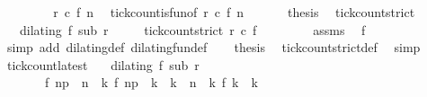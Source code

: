 \begin{isabellebody}
\isanewline
\ \ \isamarkupfalse%
\ \isamarkupfalse%
\ {\isacartoucheopen}{\isachardot}{\isachardot}{\isachardot}\ {\isacharequal}\ {\isacharhash}\isactrlsub {\isasymle}\ r\ c\ {\isacharparenleft}f\ n{\isacharparenright}{\isacartoucheclose}\ \isamarkupfalse%
\ tick{\isacharunderscore}count{\isacharunderscore}is{\isacharunderscore}fun{\isacharbrackleft}of\ r\ c\ {\isacartoucheopen}f\ n{\isacartoucheclose}{\isacharbrackright}\ \isacommand{{\isachardot}}\isamarkupfalse%
\isanewline
\ \ \isamarkupfalse%
\ \isamarkupfalse%
\ {\isacharquery}thesis\ \isacommand{{\isachardot}}\isamarkupfalse%
\isanewline
{}\isamarkupfalse%
%
\endisatagproof
{\isafoldproof}%
%
\isadelimproof
\isanewline
%
\endisadelimproof
\isanewline
{}\isamarkupfalse%
\ tick{\isacharunderscore}count{\isacharunderscore}strict{\isacharunderscore}{}{\isacharcolon}\isanewline
\ \ \ {\isacartoucheopen}dilating\ f\ sub\ r{\isacartoucheclose}\isanewline
\ \ \ \ \ {\isacartoucheopen}tick{\isacharunderscore}count{\isacharunderscore}strict\ r\ c\ {\isacharparenleft}f\ {}{\isacharparenright}\ {\isacharequal}\ {}{\isacartoucheclose}\isanewline
%
\isadelimproof
%
\endisadelimproof
%
\isatagproof
{}\isamarkupfalse%
\ {\isacharminus}\isanewline
\ \ \isamarkupfalse%
\ assms\ \isamarkupfalse%
\ {\isacartoucheopen}f\ {}\ {\isacharequal}\ {}{\isacartoucheclose}\ \isamarkupfalse%
\ {\isacharparenleft}simp\ add{\isacharcolon}\ dilating{\isacharunderscore}def\ dilating{\isacharunderscore}fun{\isacharunderscore}def{\isacharparenright}\isanewline
\ \ \isamarkupfalse%
\ {\isacharquery}thesis\ \isamarkupfalse%
\ tick{\isacharunderscore}count{\isacharunderscore}strict{\isacharunderscore}def\ \isamarkupfalse%
\ simp\isanewline
{}\isamarkupfalse%
%
\endisatagproof
{\isafoldproof}%
%
\isadelimproof
\isanewline
%
\endisadelimproof
\isanewline
{}\isamarkupfalse%
\ tick{\isacharunderscore}count{\isacharunderscore}latest{\isacharcolon}\isanewline
\ \ \ {\isacartoucheopen}dilating\ f\ sub\ r{\isacartoucheclose}\isanewline
\ \ \ \ \ \ \ {\isacartoucheopen}f\ n\isactrlsub p\ {\isacharless}\ n\ {\isasymand}\ {\isacharparenleft}{\isasymforall}k{\isachardot}\ f\ n\isactrlsub p\ {\isacharless}\ k\ {\isasymand}\ k\ {\isasymle}\ n\ {\isasymlongrightarrow}\ {\isacharparenleft}{\isasymnexists}k\ f\ k\ {\isacharequal}\ k{\isacharparenright}{\isacharparenright}{\isacartoucheclose}\isanewline

\end{isabellebody}
